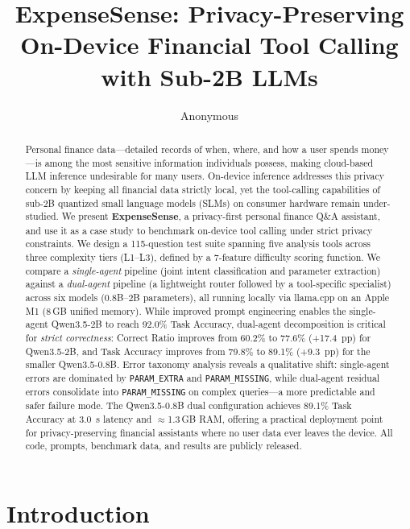 \documentclass[11pt,twocolumn]{article}
\title{ExpenseSense: Privacy-Preserving On-Device Financial Tool Calling \\ with Sub-2B LLMs}
\author{Anonymous}
\begin{document}
\maketitle

\begin{abstract}
Personal finance data---detailed records of when, where, and how a user spends money---is among the most sensitive information individuals possess, making cloud-based LLM inference undesirable for many users.
On-device inference addresses this privacy concern by keeping all financial data strictly local, yet the tool-calling capabilities of sub-2B quantized small language models (SLMs) on consumer hardware remain under-studied.
We present \textbf{ExpenseSense}, a privacy-first personal finance Q\&A assistant, and use it as a case study to benchmark on-device tool calling under strict privacy constraints.
We design a 115-question test suite spanning five analysis tools across three complexity tiers (L1--L3), defined by a 7-feature difficulty scoring function.
We compare a \emph{single-agent} pipeline (joint intent classification and parameter extraction) against a \emph{dual-agent} pipeline (a lightweight router followed by a tool-specific specialist) across six models (0.8B--2B parameters), all running locally via llama.cpp on an Apple M1 (8\,GB unified memory).
While improved prompt engineering enables the single-agent Qwen3.5-2B to reach 92.0\% Task Accuracy, dual-agent decomposition is critical for \emph{strict correctness}: Correct Ratio improves from 60.2\% to 77.6\% (+17.4~pp) for Qwen3.5-2B, and Task Accuracy improves from 79.8\% to 89.1\% (+9.3~pp) for the smaller Qwen3.5-0.8B.
Error taxonomy analysis reveals a qualitative shift: single-agent errors are dominated by \texttt{PARAM\_EXTRA} and \texttt{PARAM\_MISSING}, while dual-agent residual errors consolidate into \texttt{PARAM\_MISSING} on complex queries---a more predictable and safer failure mode.
The Qwen3.5-0.8B dual configuration achieves 89.1\% Task Accuracy at 3.0~s latency and $\approx$1.3\,GB RAM, offering a practical deployment point for privacy-preserving financial assistants where no user data ever leaves the device.
All code, prompts, benchmark data, and results are publicly released.
\end{abstract}

\section{Introduction}
\end{document}
